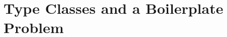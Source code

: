 \documentclass[preprint]{sigplanconf}
\begin{document}

\section{Type Classes and a Boilerplate Problem}
\label{sec:background}
\end{document}
